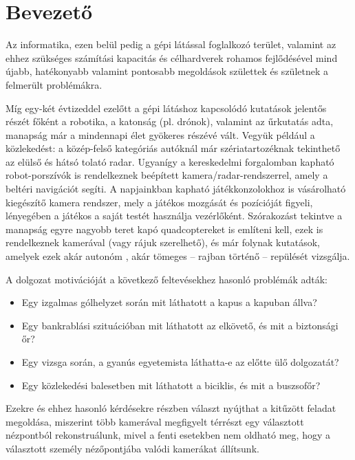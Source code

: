 \chapter*{Bevezető}

Az informatika, ezen belül pedig a gépi látással foglalkozó terület, valamint az ehhez szükséges számítási kapacitás és célhardverek rohamos fejlődésével mind újabb, hatékonyabb valamint pontosabb megoldások születtek és születnek a felmerült problémákra.

Míg egy-két évtizeddel ezelőtt a gépi látáshoz kapcsolódó kutatások jelentős részét főként a robotika, a katonság (pl. drónok), valamint az űrkutatás adta, manapság már a mindennapi élet gyökeres részévé vált. Vegyük például a közlekedést: a közép-felső kategóriás autóknál már szériatartozéknak tekinthető az elülső és hátsó tolató radar. Ugyanígy a kereskedelmi forgalomban kapható robot-porszívók is rendelkeznek beépített kamera/radar-rendszerrel, amely a beltéri navigációt segíti. A napjainkban kapható játékkonzolokhoz is vásárolható kiegészítő kamera rendszer, mely a játékos mozgását és pozícióját figyeli, lényegében a játékos a saját testét használja vezérlőként. Szórakozást tekintve a manapság egyre nagyobb teret kapó quadcoptereket \cite{quadropter} is említeni kell, ezek is rendelkeznek kamerával (vagy rájuk szerelhető), és már folynak kutatások, amelyek ezek akár autonóm \cite{quad-autonomous}, akár tömeges \cite{quad-swarm} -- rajban történő -- repülését vizsgálja.

A dolgozat motivációját a következő feltevésekhez hasonló problémák adták:
\begin{itemize}
\item Egy izgalmas gólhelyzet során mit láthatott a kapus a kapuban állva?
\item Egy bankrablási szituációban mit láthatott az elkövető, és mit a biztonsági őr?
\item Egy vizsga során, a gyanús egyetemista láthatta-e az előtte ülő dolgozatát?
\item Egy közlekedési balesetben mit láthatott a biciklis, és mit a buszsofőr?
\end{itemize}

Ezekre és ehhez hasonló kérdésekre részben választ nyújthat a kitűzött feladat megoldása, miszerint több kamerával megfigyelt térrészt egy választott nézpontból rekonstruálunk, mivel a fenti esetekben nem oldható meg, hogy a választott személy nézőpontjába valódi kamerákat állítsunk.

